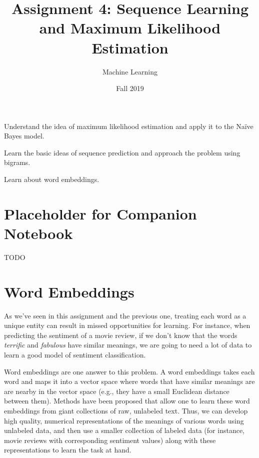 \documentclass[assignment04_Solutions]{subfiles}
\title{Assignment 4: Sequence Learning and Maximum Likelihood Estimation}
\author{Machine Learning}
\date{Fall 2019}
\begin{document}
\maketitle
\thispagestyle{firstpage}


\begin{learningobjectives}
\bi
\item Understand the idea of maximum likelihood estimation and apply it to the Na\"ive Bayes model.
\item Learn the basic ideas of sequence prediction and approach the problem using bigrams.
\item Learn about word embeddings.
\ei
\end{learningobjectives}

\section{Placeholder for Companion Notebook}
TODO

\section{Word Embeddings}
As we've seen in this assignment and the previous one, treating each word as a unique entity can result in missed opportunities for learning.  For instance, when predicting the sentiment of a movie review, if we don't know that the words \emph{terrific} and \emph{fabulous} have similar meanings, we are going to need a lot of data to learn a good model of sentiment classification.

Word embeddings are one answer to this problem.  A word embeddings takes each word and maps it into a vector space where words that have similar meanings are are nearby in the vector space (e.g., they have a small Euclidean distance between them).  Methods have been proposed that allow one to learn these word embeddings from giant collections of raw, unlabeled text.  Thus, we can develop high quality, numerical representations of the meanings of various words using unlabeled data, and then use a smaller collection of labeled data (for instance, movie reviews with corresponding sentiment values) along with these representations to learn the task at hand.
\end{document}
